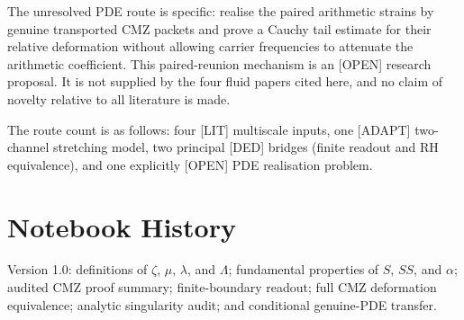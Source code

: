 \documentclass[11pt]{amsart}
\numberwithin{equation}{section}
\theoremstyle{plain}
\theoremstyle{definition}
\theoremstyle{remark}
\begin{document}
The unresolved PDE route is specific: realise the paired arithmetic strains
by genuine transported CMZ packets and prove a Cauchy tail estimate for their
relative deformation without allowing carrier frequencies to attenuate the
arithmetic coefficient.  This paired-reunion mechanism is an \textup{[OPEN]}
research proposal.  It is not supplied by the four fluid papers cited here,
and no claim of novelty relative to all literature is made.

The route count is as follows: four \textup{[LIT]} multiscale inputs, one
\textup{[ADAPT]} two-channel stretching model, two principal \textup{[DED]}
bridges (finite readout and RH equivalence), and one explicitly
\textup{[OPEN]} PDE realisation problem.

\section*{Notebook History}
\label{sec:notebook-history}

Version 1.0: definitions of $\zeta$, $\mu$, $\lambda$, and $\Lambda$;
fundamental properties of $S$, $SS$, and $\alpha$; audited CMZ proof summary;
finite-boundary readout; full CMZ deformation equivalence; analytic
singularity audit; and conditional genuine-PDE transfer.
\end{document}
